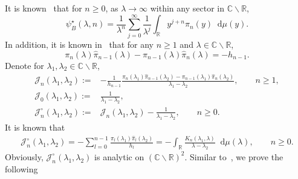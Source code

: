 \documentclass[a4paper]{article}
\theoremstyle{plain}
\theoremstyle{definition}
\newcommand{\dif}{\mathop{}\!\mathrm{d}}
\newcommand{\RR}{\mathbb{R}}
\newcommand{\CC}{\mathbb{C}}
\begin{document}
	It is known~\cite{Ruzza} that for $n\ge0$, as $\lambda\to\infty$ within any sector in $\CC\backslash\RR$,
		\begin{equation} \label{poincare}
			\psi_B^\star(\lambda,n)=\frac{1}{\lambda^n}\sum_{j=0}^\infty \frac{1}{\lambda^j}\int_\RR y^{j+n}\pi_n(y)\dif\mu(y).
		\end{equation}
	In addition, it is known in~\cite{Ruzza,Eynard} that for any $n\ge1$ and $\lambda\in\CC\backslash\RR$,
		\begin{equation}
			\pi_n(\lambda)\widehat\pi_{n-1}(\lambda)-\pi_{n-1}(\lambda)\widehat\pi_n(\lambda)=-h_{n-1}.\label{reduced-cd}
		\end{equation} 
		Denote for $\lambda_1,\lambda_2\in\CC\backslash\RR$,
		\begin{align}
		\mathcal J_n(\lambda_1,\lambda_2):=&-\frac{1}{h_{n-1}}\frac{\pi_n(\lambda_1)\widehat\pi_{n-1}(\lambda_2)-\pi_{n-1}(\lambda_1)\widehat\pi_n(\lambda_2)}{\lambda_1-\lambda_2},\qquad n\ge1, \label{jn}\\
		\mathcal J_0(\lambda_1,\lambda_2):=&\frac{1}{\lambda_1-\lambda_2},\\
		\mathcal J^\circ_n(\lambda_1,\lambda_2):=&\mathcal J_n(\lambda_1,\lambda_2)-\frac{1}{\lambda_1-\lambda_2},\qquad n\ge0.
	\end{align}
	It is known that~\cite{Ruzza,Eynard}
	\begin{align}
		\mathcal J_n^\circ(\lambda_1,\lambda_2)=-\sum_{l=0}^{n-1}\frac{\pi_l(\lambda_1)\widehat\pi_l(\lambda_2)}{h_l}=-\int_\RR\frac{K_n(\lambda_1,\lambda)}{\lambda-\lambda_2}\dif\mu(\lambda),\qquad n\ge0. \label{trans-cd}
	\end{align}
	Obviously, $\mathcal J_n^\circ(\lambda_1,\lambda_2)$ is analytic on $(\CC\backslash\RR)^2$. Similar to~\cite{DYZcp1}, we prove the following
\end{document}
